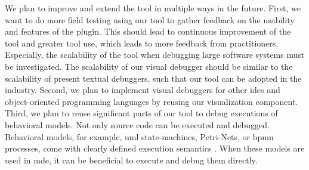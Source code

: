 \documentclass[conference]{IEEEtran}
\begin{document}
We plan to improve and extend the tool in multiple ways in the future.
First, we want to do more field testing using our tool to gather feedback on the usability and features of the plugin.
This should lead to continuous improvement of the tool and greater tool use, which leads to more feedback from practitioners. 
Especially, the scalability of the tool when debugging large software systems must be investigated.
The scalability of our visual debugger should be similar to the scalability of present textual debuggers, such that our tool can be adopted in the industry.
Second, we plan to implement visual debuggers for other \glspl*{ide} and object-oriented programming languages by reusing our visualization component.
Third, we plan to reuse significant parts of our tool to debug executions of behavioral models.
Not only source code can be executed and debugged.
Behavioral models, for example, \gls*{uml} state-machines, Petri-Nets, or \gls{bpmn} processes, come with clearly defined execution semantics \cite{krauterBehavioralConsistencyHeterogeneous2021}.
When these models are used in \gls*{mde}, it can be beneficial to execute and debug them directly.




\end{document}
